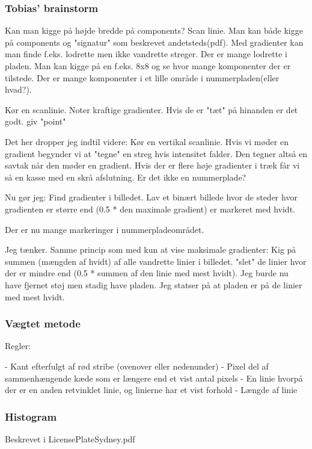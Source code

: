 \subsubsection{Tobias' brainstorm}
Kan man kigge på højde bredde på components?
Scan linie. Man kan både kigge på components og "signatur" som beskrevet andetsteds(pdf).
Med gradienter kan man finde f.eks. lodrette men ikke vandrette streger. Der er mange lodrette i pladen.
Man kan kigge på en f.eks. 8x8 og se hvor mange komponenter der er tilstede. Der er mange komponenter i et 
lille område i nummerpladen(eller hvad?).

Kør en scanlinie. Noter kraftige gradienter. Hvis de er "tæt" på hinanden er det godt. giv "point"

Det her dropper jeg  indtil videre:
Kør en vertikal scanlinie. Hvis vi møder en gradient begynder vi at "tegne" en streg hvis intensitet 
falder. Den tegner altså en savtak når den møder en gradient. Hvis der er flere høje gradienter i træk får 
vi så en kasse med en skrå afslutning. Er det ikke en nummerplade? 


Nu gør jeg:
Find gradienter i billedet. Lav et binært billede hvor de steder hvor gradienten er større end (0.5 * den 
maximale gradient) er markeret med hvidt.

Der er nu mange markeringer i nummerpladeområdet.

Jeg tænker. Samme princip som med kun at vise maksimale gradienter:
Kig på summen (mængden af hvidt) af alle vandrette linier i billedet. "slet" de linier hvor der er mindre 
end (0.5 * summen af den linie med mest hvidt). Jeg burde nu have fjernet støj men stadig have pladen. Jeg 
statser på at pladen er på de linier med mest hvidt.

\subsubsection{Vægtet metode}

Regler:

- Kant efterfulgt af rød stribe (ovenover eller nedenunder)
- Pixel del af sammenhængende kæde som er længere end et vist antal pixels
- En linie hvorpå der er en anden retvinklet linie, og linierne har et vist forhold
- Længde af linie

\subsubsection{Histogram}

Beskrevet i LicensePlateSydney.pdf

